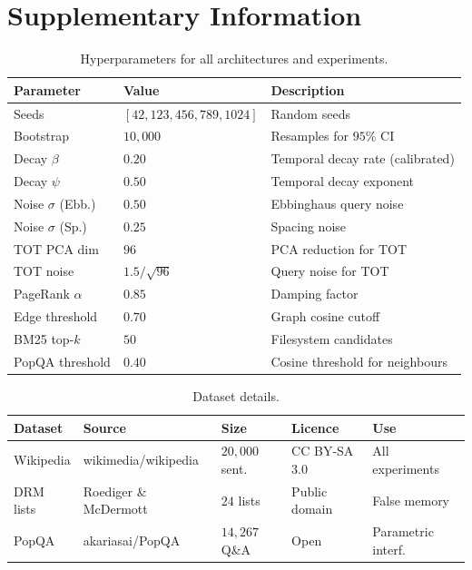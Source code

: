 \documentclass[11pt]{article}
\begin{document}
\clearpage
\section*{Supplementary Information}

\begin{table}[!ht]
\centering
\caption{Hyperparameters for all architectures and experiments.}
\label{tab:hyperparams}
\small
\begin{tabular}{@{}llp{8cm}@{}}
\toprule
\textbf{Parameter} & \textbf{Value} & \textbf{Description} \\
\midrule
Seeds & $[42, 123, 456, 789, 1024]$ & Random seeds \\
Bootstrap & $10{,}000$ & Resamples for $95\%$ CI \\
Decay $\beta$ & $0.20$ & Temporal decay rate (calibrated) \\
Decay $\psi$ & $0.50$ & Temporal decay exponent \\
Noise $\sigma$ (Ebb.) & $0.50$ & Ebbinghaus query noise \\
Noise $\sigma$ (Sp.) & $0.25$ & Spacing noise \\
TOT PCA dim & $96$ & PCA reduction for TOT \\
TOT noise & $1.5/\sqrt{96}$ & Query noise for TOT \\
PageRank $\alpha$ & $0.85$ & Damping factor \\
Edge threshold & $0.70$ & Graph cosine cutoff \\
BM25 top-$k$ & $50$ & Filesystem candidates \\
PopQA threshold & $0.40$ & Cosine threshold for neighbours \\
\bottomrule
\end{tabular}
\end{table}

\begin{table}[!ht]
\centering
\caption{Dataset details.}
\label{tab:datasets}
\small
\begin{tabular}{@{}lllll@{}}
\toprule
\textbf{Dataset} & \textbf{Source} & \textbf{Size} & \textbf{Licence} & \textbf{Use} \\
\midrule
Wikipedia & wikimedia/wikipedia & $20{,}000$ sent. & CC BY-SA 3.0 & All experiments \\
DRM lists & Roediger \& McDermott & $24$ lists & Public domain & False memory \\
PopQA & akariasai/PopQA & $14{,}267$ Q\&A & Open & Parametric interf. \\
\bottomrule
\end{tabular}
\end{table}
\end{document}

